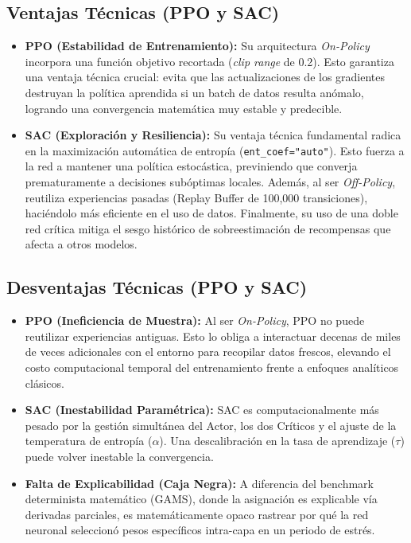 \documentclass[12pt]{article}
\begin{document}
\subsection{Ventajas Técnicas (PPO y SAC)}
\begin{itemize}
    \item \textbf{PPO (Estabilidad de Entrenamiento):} Su arquitectura \textit{On-Policy} incorpora una función objetivo recortada (\textit{clip range} de 0.2). Esto garantiza una ventaja técnica crucial: evita que las actualizaciones de los gradientes destruyan la política aprendida si un batch de datos resulta anómalo, logrando una convergencia matemática muy estable y predecible.
    \item \textbf{SAC (Exploración y Resiliencia):} Su ventaja técnica fundamental radica en la maximización automática de entropía (\texttt{ent\_coef="auto"}). Esto fuerza a la red a mantener una política estocástica, previniendo que converja prematuramente a decisiones subóptimas locales. Además, al ser \textit{Off-Policy}, reutiliza experiencias pasadas (Replay Buffer de 100,000 transiciones), haciéndolo más eficiente en el uso de datos. Finalmente, su uso de una doble red crítica mitiga el sesgo histórico de sobreestimación de recompensas que afecta a otros modelos.
\end{itemize}

\subsection{Desventajas Técnicas (PPO y SAC)}
\begin{itemize}
    \item \textbf{PPO (Ineficiencia de Muestra):} Al ser \textit{On-Policy}, PPO no puede reutilizar experiencias antiguas. Esto lo obliga a interactuar decenas de miles de veces adicionales con el entorno para recopilar datos frescos, elevando el costo computacional temporal del entrenamiento frente a enfoques analíticos clásicos.
    \item \textbf{SAC (Inestabilidad Paramétrica):} SAC es computacionalmente más pesado por la gestión simultánea del Actor, los dos Críticos y el ajuste de la temperatura de entropía ($\alpha$). Una descalibración en la tasa de aprendizaje ($\tau$) puede volver inestable la convergencia.
    \item \textbf{Falta de Explicabilidad (Caja Negra):} A diferencia del benchmark determinista matemático (GAMS), donde la asignación es explicable vía derivadas parciales, es matemáticamente opaco rastrear por qué la red neuronal seleccionó pesos específicos intra-capa en un periodo de estrés.
\end{itemize}
\end{document}
